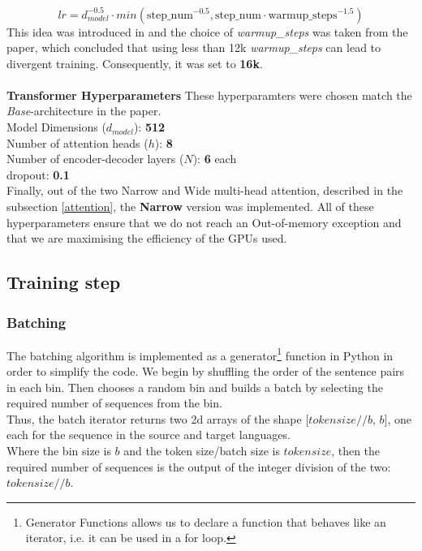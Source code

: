 \documentclass[12pt,a4paper,twoside,openright]{report}
\newcommand{\red}[1]{\textcolor{red}{#1}}
\begin{document}
\[ lr = d_{model}^{-0.5} \cdot min (\text{step\_num}^{-0.5}, \text{step\_num} \cdot \text{warmup\_steps}^{-1.5}) \]
This idea was introduced in\cite{transformers} and the choice of \textit{warmup\_steps} was taken from the paper\cite{training-tips}, which concluded that using less than 12k \textit{warmup\_steps} can lead to divergent training. Consequently, it was set to \textbf{16k}.
\\\\
\textbf{Transformer Hyperparameters} These hyperparamters were chosen match the \textit{Base}-architecture in the paper\cite{transformers}. \\
{Model Dimensions ($d_{model}$)}: \textbf{512}
\\
{Number of attention heads ($h$)}: \textbf{8}
\\
{Number of encoder-decoder layers ($N$)}: \textbf{6} each
\\
{dropout}: \textbf{0.1}
\\
Finally, out of the two Narrow and Wide multi-head attention, described in the subsection \ref{attention}, the \textbf{Narrow} version was implemented. All of these hyperparameters ensure that we do not reach an Out-of-memory exception and that we are maximising the efficiency of the GPUs used.


\subsection{Training step}
\label{training-step}
\subsubsection{Batching}



The batching algorithm is implemented as a generator\footnote{Generator Functions allows us to declare a function that behaves like an iterator, i.e. it can be used in a for loop.} function in Python in order to simplify the code. We begin by shuffling the order of the sentence pairs in each bin. Then chooses a random bin and builds a batch by selecting the required number of sequences from the bin. \\
Thus, the batch iterator returns two 2d arrays of the shape [$token size // b$, $b$], one each for the sequence in the source and target languages. \\
Where the bin size is $b$ and the token size/batch size is $token size$, then the required number of sequences is the output of the integer division of the two: $token size//b$.
\end{document}
